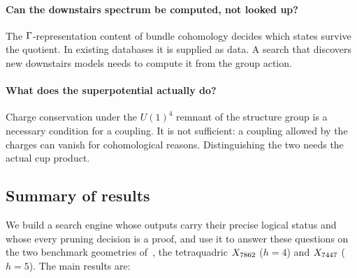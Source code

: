 \paragraph{Can the downstairs spectrum be computed, not looked up?} The
$\Gamma$-representation content of bundle cohomology decides which states survive
the quotient. In existing databases it is supplied as data. A search that
discovers new downstairs models needs to compute it from the group action.

\paragraph{What does the superpotential actually do?} Charge conservation under
the $U(1)^4$ remnant of the structure group is a necessary condition for a
coupling. It is not sufficient: a coupling allowed by the charges can vanish
for cohomological reasons. Distinguishing the two needs the actual cup product.

\subsection{Summary of results}

We build a search engine whose outputs carry their precise logical status and
whose every pruning decision is a proof, and use it to answer these questions
on the two benchmark geometries of~\cite{ACGLP2013}, the tetraquadric
$X_{7862}$ ($h=4$) and $X_{7447}$ ($h=5$). The main results are:

